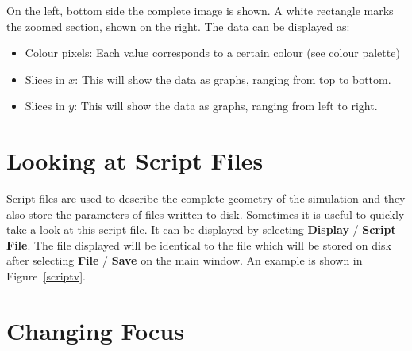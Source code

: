 On the left, bottom side the complete image is shown. A white
rectangle marks the zoomed section, shown on the right. The data can be
displayed as:

\begin{itemize}
\item  Colour pixels: Each value corresponds to a certain colour (see colour
palette)

\item  Slices in $x$: This will show the data as graphs, ranging from top to
bottom.

\item  Slices in $y$: This will show the data as graphs, ranging from left
to right.
\end{itemize}

\section{Looking at Script Files}

Script files are used to describe the complete geometry of the simulation
and they also store the parameters of files written to disk. Sometimes it is
useful to quickly take a look at this script file. It can be displayed by
selecting \textbf{Display} / \textbf{Script File}. The file displayed will
be identical to the file which will be stored on disk after selecting 
\textbf{File} / \textbf{Save} on the main window. An example is shown in
Figure~\ref{scriptv}.


\section{Changing Focus}

